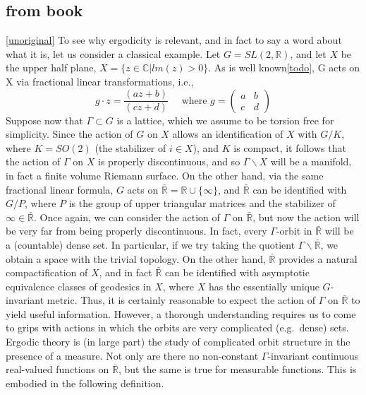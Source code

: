 \documentclass[
  12pt
]{article}
\theoremstyle{break}
\theoremstyle{plain}
\begin{document}
  \hypertarget{from-book}{%
  \subsection{from book}\label{from-book}}

  \href{Zimmer\%20p.4}{{[}unoriginal{]}} To see why ergodicity is
  relevant, and in fact to say a word about what it is, let us consider a
  classical example. Let $G = SL(2, \mathbb{R})$, and let $X$ be the
  upper half plane, $X= \{z \in \mathbb{C} | lm(z) > 0\}$. As is well
  known\href{upper\%20half\%20plane,\%20möbius\%20transforms,\%20give\%20reference\%20to\%20misc\%20things.\%20and\%20figure\%20out\%20what\%20the\%20actual\%20example\%20is.\%20figure\%20out\%20what\%20the\%20theorem\%20tries\%20to\%20answer.}{{[}todo{]}},
  G acts on X via fractional linear transformations, i.e., \[
  g \cdot z=\frac{(az+b)}{(cz+d)}
  \quad
  \text{ where }g=
  \begin{pmatrix}a & b \\ c & d\end{pmatrix}
  \] Suppose now that $\Gamma \subset G$ is a lattice, which we assume
  to be torsion free for simplicity. Since the action of $G$ on $X$
  allows an identification of $X$ with $G/K$, where $K = SO(2)$ (the
  stabilizer of $i \in X$), and $K$ is compact, it follows that the
  action of $\Gamma$ on $X$ is properly discontinuous, and so
  $\Gamma\backslash X$ will be a manifold, in fact a finite volume
  Riemann surface. On the other hand, via the same fractional linear
  formula, $G$ acts on
  $\bar{\mathbb{R}} = \mathbb{R} \cup \{ \infty \}$, and
  $\bar{\mathbb{R}}$ can be identified with $G/P$, where $P$ is the
  group of upper triangular matrices and the stabilizer of
  $\infty \in \bar{\mathbb{R}}$. Once again, we can consider the action
  of $\Gamma$ on $\bar{\mathbb{R}}$, but now the action will be very
  far from being properly discontinuous. In fact, every $\Gamma$-orbit
  in $\bar{\mathbb{R}}$ will be a (countable) dense set. In particular,
  if we try taking the quotient $\Gamma\backslash\bar{\mathbb{R}}$, we
  obtain a space with the trivial topology. On the other hand,
  $\bar{\mathbb{R}}$ provides a natural compactification of $X$, and
  in fact $\bar{\mathbb{R}}$ can be identified with asymptotic
  equivalence classes of geodesics in $X$, where $X$ has the
  essentially unique $G$-invariant metric. Thus, it is certainly
  reasonable to expect the action of $\Gamma$ on $\bar{\mathbb{R}}$ to
  yield useful information. However, a thorough understanding requires us
  to come to grips with actions in which the orbits are very complicated
  (e.g.~dense) sets. Ergodic theory is (in large part) the study of
  complicated orbit structure in the presence of a measure. Not only are
  there no non-constant $\Gamma$-invariant continuous real-valued
  functions on $\bar{\mathbb{R}}$, but the same is true for measurable
  functions. This is embodied in the following definition.
\end{document}
